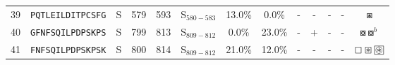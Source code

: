 \begin{tabular}{rcccccccccccc}
39 &  \texttt{PQTLEILDITPCSFG} &       S &    579 &   593 &  S$_{580-583}$ &                          13.0\% &                            0.0\% &          - &           - &          - &           - &                                                                                                             $ \boxast $ \\
40 &  \texttt{GFNFSQILPDPSKPS} &       S &    799 &   813 &  S$_{809-812}$ &                           0.0\% &                           23.0\% &          - &           + &          - &           - &                                                                                             $ \boxcircle \boxcircle^b $ \\
41 &  \texttt{FNFSQILPDPSKPSK} &       S &    800 &   814 &  S$_{809-812}$ &                          21.0\% &                           12.0\% &          - &           - &          - &           - &                                                   $ \boxempty \boxast \setlength{\fboxsep}{0.5pt} \boxed{\circledast} $ \\
\bottomrule
\end{tabular}
